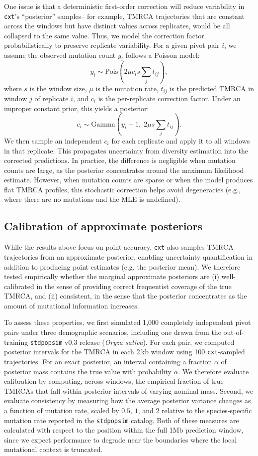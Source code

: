 \documentclass{article}
\newcommand{\cxtkit}{\texttt{cxt}\xspace}
\newcommand{\stdpopsim}{\texttt{stdpopsim}\xspace}
\begin{document}
One issue is that a deterministic first-order correction will reduce variability in \cxtkit's ``posterior'' samples-- 
for example, TMRCA trajectories that are constant across the windows but have distinct values across replicates, would be all collapsed to the same value. 
Thus, we model the correction factor probabilistically to preserve replicate variability. 
For a given pivot pair $i$, we assume the observed mutation count $y_i$ follows a Poisson model:
\[
y_i \sim \text{Pois}\left(2 \mu c_i s \sum_j t_{ij}\right),
\]
where $s$ is the window size, $\mu$ is the mutation rate, $t_{ij}$ is the predicted TMRCA in window $j$ of replicate $i$, 
and $c_i$ is the per-replicate correction factor. Under an improper constant prior, this yields a posterior:
\[
c_i \sim \text{Gamma}\left(y_i + 1,\; 2 \mu s \sum_j t_{ij}\right).
\]
We then sample an independent $c_i$ for each replicate and apply it to all windows in that replicate. 
This propagates uncertainty from diversity estimation into the corrected predictions. 
In practice, the difference is negligible when mutation counts are large, as the posterior concentrates around the maximum likelihood estimate. 
However, when mutation counts are sparse or when the model produces flat TMRCA profiles, 
this stochastic correction helps avoid degeneracies (e.g., where there are no mutations and the MLE is undefined). 

\subsection*{Calibration of approximate posteriors}
\label{sec:calibration}

While the results above focus on point accuracy, \cxtkit also samples TMRCA trajectories from an approximate posterior, 
enabling uncertainty quantification in addition to producing point estimates (e.g. the posterior mean). 
We therefore tested empirically
whether the marginal approximate posteriors are (i) well-calibrated in the sense of providing correct frequentist
coverage of the true TMRCA, 
and (ii) consistent, in the sense that the posterior concentrates as the amount of mutational information increases.

To assess these properties, we first simulated 1{,}000 completely independent pivot pairs under three demographic scenarios, 
including one drawn from the out-of-training \stdpopsim v0.3 release (\emph{Oryza sativa}).
For each pair, we computed posterior intervals for the TMRCA in each 2\,kb window using
100 \cxtkit-sampled trajectories. 
For an exact posterior, an interval containing a fraction $\alpha$ of posterior mass contains the true value with probability $\alpha$. We therefore evaluate calibration by computing, across windows, the empirical fraction of true TMRCAs
that fall within posterior intervals of varying nominal mass. 
Second, we evaluate consistency by measuring how the average posterior variance changes as a function of mutation rate,
scaled by $0.5$, $1$, and $2$ relative to the species-specific mutation rate reported in the \stdpopsim catalog. 
Both of these measures are calculated with respect to the position within the full 1Mb prediction window,
since we expect performance to degrade near the
boundaries where the local mutational context is truncated.
\end{document}
